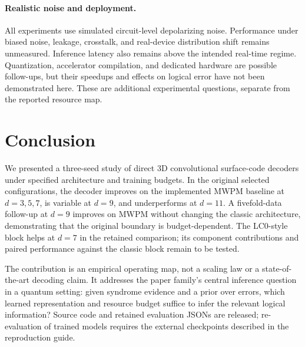 \documentclass[11pt,a4paper]{article}
\begin{document}
\paragraph{Realistic noise and deployment.}
All experiments use simulated circuit-level depolarizing noise.
Performance under biased noise, leakage, crosstalk, and real-device
distribution shift remains unmeasured. Inference latency also remains
above the intended real-time regime. Quantization, accelerator compilation,
and dedicated hardware are possible follow-ups, but their speedups and
effects on logical error have not been demonstrated here. These are
additional experimental questions, separate from the reported resource map.

\section{Conclusion}
We presented a three-seed study of direct 3D convolutional surface-code
decoders under specified architecture and training budgets. In the
original selected configurations, the decoder improves on the implemented
MWPM baseline at $d=3,5,7$, is variable at $d=9$, and underperforms at
$d=11$. A fivefold-data follow-up at $d=9$ improves on MWPM without
changing the classic architecture, demonstrating that the original
boundary is budget-dependent. The LC0-style block helps at $d=7$ in
the retained comparison; its component contributions and paired
performance against the classic block remain to be tested.

The contribution is an empirical operating map, not a scaling law or
a state-of-the-art decoding claim. It addresses the paper family's
central inference question in a quantum setting: given syndrome evidence
and a prior over errors, which learned representation and resource
budget suffice to infer the relevant logical information? Source code
and retained evaluation JSONs are released; re-evaluation of trained
models requires the external checkpoints described in the reproduction
guide.



\end{document}
